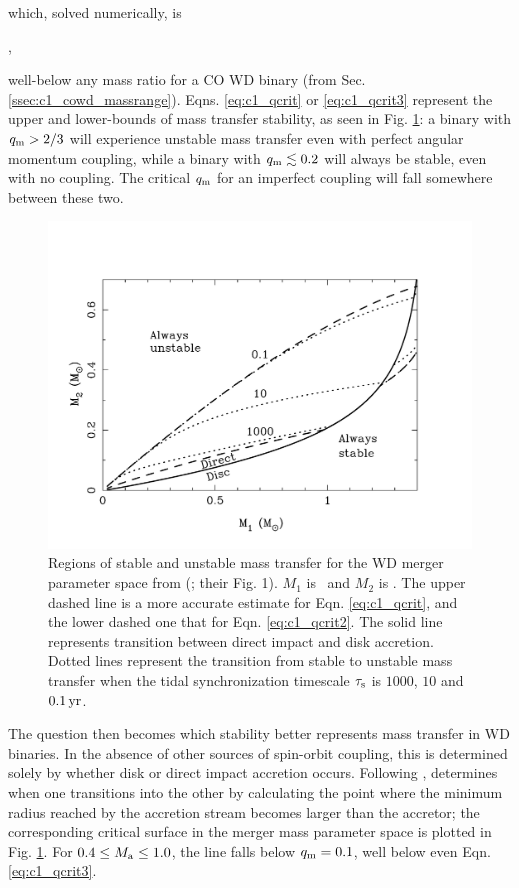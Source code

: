 \noindent which, solved numerically, is

\eqbegin
\qm{},
\label{eq:c1_qcrit3}
\eqend

\noindent well-below any mass ratio for a CO WD binary (from Sec. \ref{ssec:c1_cowd_massrange}).  Eqns. \ref{eq:c1_qcrit} or \ref{eq:c1_qcrit3} represent the upper and lower-bounds of mass transfer stability, as seen in Fig. \ref{fig:c1_stability}: a binary with $\qm > 2/3$ will experience unstable mass transfer even with perfect angular momentum coupling, while a binary with $\qm \lesssim 0.2$ will always be stable, even with no coupling.  The critical $\qm$ for an imperfect coupling will fall somewhere between these two.

\begin{figure}
\centering
\includegraphics[angle=0,width=0.6\columnwidth]{introduction/figures/marsns04_stab.pdf}
\caption{Regions of stable and unstable mass transfer for the WD merger parameter space from \citeauthor{marsns04} (\citeyear{marsns04}; their Fig. 1).  $M_1$ is \Ma\, and $M_2$ is \Md.  The upper dashed line is a more accurate estimate for Eqn. \ref{eq:c1_qcrit}, and the lower dashed one that for Eqn. \ref{eq:c1_qcrit2}.  The solid line represents transition between direct impact and disk accretion.  Dotted lines represent the transition from stable to unstable mass transfer when the tidal synchronization timescale $\tau_\mathrm{s}$ is $1000$, $10$ and $0.1\,\mathrm{yr}$.}
\label{fig:c1_stability}
\end{figure}

The question then becomes which stability better represents mass transfer in WD binaries.  In the absence of other sources of spin-orbit coupling, this is determined solely by whether disk or direct impact accretion occurs.  Following \citep{lubos75}, \citep{nele+01} determines when one transitions into the other by calculating the point where the minimum radius reached by the accretion stream becomes larger than the accretor; the corresponding critical surface in the merger mass parameter space is plotted in Fig. \ref{fig:c1_stability}.  For $0.4 \leq \Ma \leq 1.0$, the line falls below $\qm = 0.1$, well below even Eqn. \ref{eq:c1_qcrit3}.

